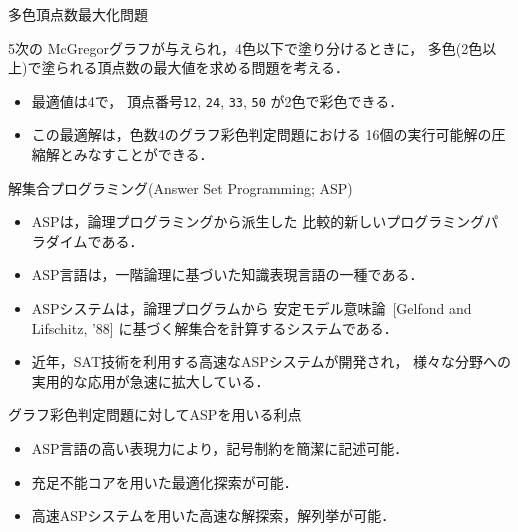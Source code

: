 \documentclass[dvipdfmx,11pt]{beamer}
\newcommand{\code}[1]{\lstinline[basicstyle=\ttfamily]{#1}}
\begin{document}
\begin{frame}{多色頂点数最大化問題}
 \begin{exampleblock}{}
  5次の McGregorグラフが与えられ，4色以下で塗り分けるときに，
  多色(2色以上)で塗られる頂点数の最大値を求める問題を考える．
 \end{exampleblock}

 \begin{itemize}
  \item 最適値は4で，
	頂点番号\code{12}, \code{24}, \code{33}, \code{50}
	が2色で彩色できる．
  \item この最適解は，色数4のグラフ彩色判定問題における
	\alert{16}個の実行可能解の圧縮解とみなすことができる．
 \end{itemize}
\end{frame}

\begin{frame}{解集合プログラミング(Answer Set Programming; ASP)}
 \begin{itemize}
  \item \alert{ASP}は，論理プログラミングから派生した
        比較的新しいプログラミングパラダイムである．
  \item \alert{ASP言語}は，一階論理に基づいた知識表現言語の一種である．
  \item \alert{ASPシステム}は，論理プログラムから
        安定モデル意味論~{\scriptsize[Gelfond and Lifschitz, '88]}
        に基づく解集合を計算するシステムである．
  \item 近年，SAT技術を利用する高速なASPシステムが開発され，
        様々な分野への実用的な応用が急速に拡大している．
 \end{itemize}
 
 \begin{alertblock}{グラフ彩色判定問題に対してASPを用いる利点}
  \begin{itemize}
   \item ASP言語の高い表現力により，記号制約を簡潔に記述可能．
   \item 充足不能コアを用いた最適化探索が可能．
   \item 高速ASPシステムを用いた高速な解探索，解列挙が可能．
  \end{itemize}
 \end{alertblock}
\end{frame}
\end{document}
